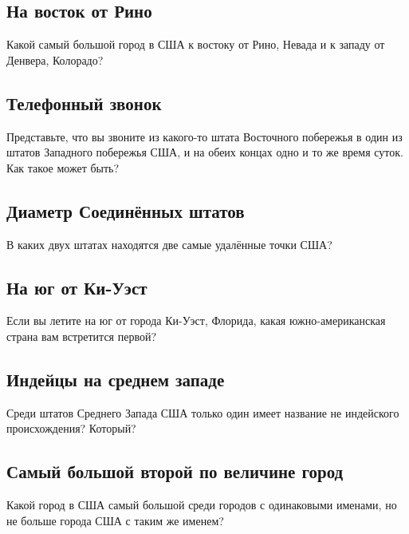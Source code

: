 \subsection*{На восток от Рино}%


Какой самый большой город в США к востоку от Рино, Невада  и к западу от Денвера, Колорадо?


\subsection*{Телефонный звонок}%


Представьте, что вы звоните из какого-то штата Восточного побережья в один из штатов Западного побережья США, и на обеих концах одно и то же время суток. Как такое может быть?  
 


\subsection*{Диаметр Соединённых штатов}%


В каких двух штатах находятся две самые удалённые точки США?  
       


\subsection*{На юг от Ки-Уэст}%


Если вы летите на юг от города Ки-Уэст, Флорида, какая южно-американская страна вам 
встретится первой?     

\subsection*{Индейцы на среднем западе}%


Среди  штатов Среднего Запада США только один имеет название не индейского происхождения?  Который?    




\subsection*{Самый большой второй по величине город}%


Какой город  в США самый большой среди городов с одинаковыми именами, но  не больше города США с таким же именем?

